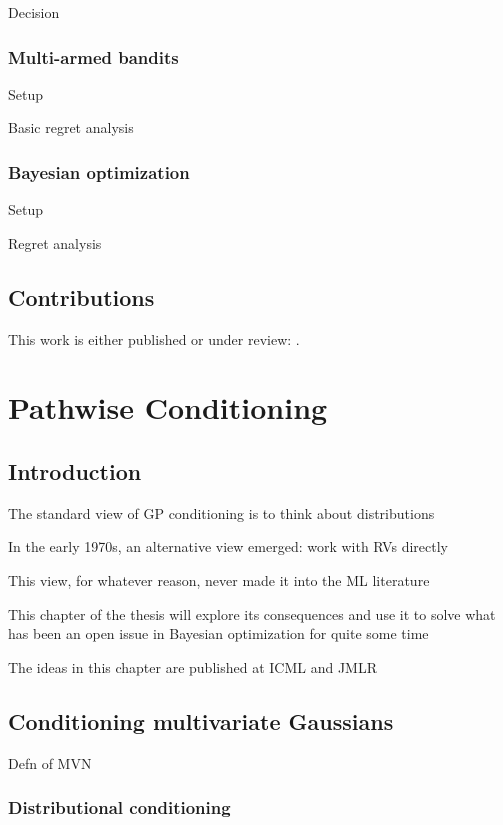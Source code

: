 \documentclass[11pt]{book}
\begin{document}
Decision

\subsection{Multi-armed bandits}

Setup

Basic regret analysis

\subsection{Bayesian optimization}

Setup

Regret analysis

\section{Contributions}

This work is either published or under review: \textcite{wilson20,borovitskiy20,borovitskiy21,wilson21,hutchinson21}.



\chapter{Pathwise Conditioning}
\label{ch:pathwise}

\section{Introduction}

The standard view of GP conditioning is to think about distributions

In the early 1970s, an alternative view emerged: work with RVs directly

This view, for whatever reason, never made it into the ML literature

This chapter of the thesis will explore its consequences and use it to solve what has been an open issue in Bayesian optimization for quite some time

The ideas in this chapter are published at ICML and JMLR

\section{Conditioning multivariate Gaussians}

Defn of MVN

\subsection{Distributional conditioning}
\end{document}
